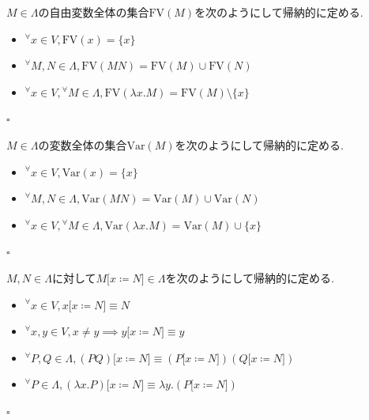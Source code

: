 \begin{definition}
$M \in \Lambda$の自由変数全体の集合$\textrm{FV}(M)$を次のようにして帰納的に定める.
\begin{itemize}
    \item ${^{\forall}}x \in V, \textrm{FV}(x) = \{x\}$
    \item ${^{\forall}}M, N \in \Lambda, \textrm{FV}(M N) = \textrm{FV}(M) \cup \textrm{FV}(N)$
    \item ${^{\forall}}x \in V, {^{\forall}}M \in \Lambda, \textrm{FV}(\lambda x.M) = \textrm{FV}(M) \setminus \{x\}$
\end{itemize}
\hfill $\square$
\end{definition}

\begin{definition}
$M \in \Lambda$の変数全体の集合$\textrm{Var}(M)$を次のようにして帰納的に定める.
\begin{itemize}
    \item ${^{\forall}}x \in V, \textrm{Var}(x) = \{x\}$
    \item ${^{\forall}}M, N \in \Lambda, \textrm{Var}(M N) = \textrm{Var}(M) \cup \textrm{Var}(N)$
    \item ${^{\forall}}x \in V, {^{\forall}}M \in \Lambda, \textrm{Var}(\lambda x.M) = \textrm{Var}(M) \cup \{x\}$
\end{itemize}
\hfill $\square$
\end{definition}

\begin{definition}
$M, N \in \Lambda$に対して$M \lbrack x \coloneq N \rbrack \in \Lambda$を次のようにして帰納的に定める.
\begin{itemize}
    \item ${^{\forall}}x \in V, x \lbrack x \coloneq N \rbrack \equiv N$
    \item ${^{\forall}}x,y \in V, x \neq y \implies y \lbrack x \coloneq N \rbrack \equiv y$
    \item ${^{\forall}}P,Q \in \Lambda, (PQ) \lbrack x \coloneq N \rbrack \equiv (P \lbrack x \coloneq N \rbrack)(Q \lbrack x \coloneq N \rbrack)$
    \item ${^{\forall}}P \in \Lambda, (\lambda x.P) \lbrack x \coloneq N \rbrack \equiv \lambda y.(P \lbrack x \coloneq N \rbrack)$
\end{itemize}
\hfill $\square$
\end{definition}

